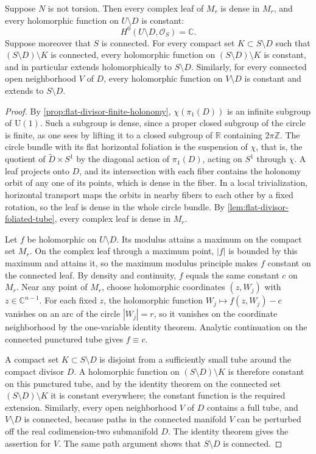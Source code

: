 \begin{theorem}\label{thm:flat-divisor-holomorphic-rigidity}
Suppose $N$ is not torsion. Then every complex leaf of $M_r$ is dense in $M_r$, and every holomorphic function on $U\setminus D$ is constant:
\[
 H^0(U\setminus D,\mathcal O_S)=\mathbb C.
\]
Suppose moreover that $S$ is connected. For every compact set $K\subset S\setminus D$ such that $(S\setminus D)\setminus K$ is connected, every holomorphic function on $(S\setminus D)\setminus K$ is constant, and in particular extends holomorphically to $S\setminus D$. Similarly, for every connected open neighborhood $V$ of $D$, every holomorphic function on $V\setminus D$ is constant and extends to $S\setminus D$.
\end{theorem}
\begin{proof}
By \cref{prop:flat-divisor-finite-holonomy}, $\chi(\pi_1(D))$ is an infinite subgroup of $\mathrm U(1)$. Such a subgroup is dense, since a proper closed subgroup of the circle is finite, as one sees by lifting it to a closed subgroup of $\mathbb R$ containing $2\pi\mathbb Z$. The circle bundle with its flat horizontal foliation is the suspension of $\chi$, that is, the quotient of $\widetilde D\times S^1$ by the diagonal action of $\pi_1(D)$, acting on $S^1$ through $\chi$. A leaf projects onto $D$, and its intersection with each fiber contains the holonomy orbit of any one of its points, which is dense in the fiber. In a local trivialization, horizontal transport maps the orbits in nearby fibers to each other by a fixed rotation, so the leaf is dense in the whole circle bundle. By \cref{lem:flat-divisor-foliated-tube}, every complex leaf is dense in $M_r$.

Let $f$ be holomorphic on $U\setminus D$. Its modulus attains a maximum on the compact set $M_r$. On the complex leaf through a maximum point, $|f|$ is bounded by this maximum and attains it, so the maximum modulus principle makes $f$ constant on the connected leaf. By density and continuity, $f$ equals the same constant $c$ on $M_r$. Near any point of $M_r$, choose holomorphic coordinates $(z,W_j)$ with $z\in\mathbb C^{n-1}$. For each fixed $z$, the holomorphic function $W_j\mapsto f(z,W_j)-c$ vanishes on an arc of the circle $|W_j|=r$, so it vanishes on the coordinate neighborhood by the one-variable identity theorem. Analytic continuation on the connected punctured tube gives $f\equiv c$.

A compact set $K\subset S\setminus D$ is disjoint from a sufficiently small tube around the compact divisor $D$. A holomorphic function on $(S\setminus D)\setminus K$ is therefore constant on this punctured tube, and by the identity theorem on the connected set $(S\setminus D)\setminus K$ it is constant everywhere; the constant function is the required extension. Similarly, every open neighborhood $V$ of $D$ contains a full tube, and $V\setminus D$ is connected, because paths in the connected manifold $V$ can be perturbed off the real codimension-two submanifold $D$. The identity theorem gives the assertion for $V$. The same path argument shows that $S\setminus D$ is connected.
\end{proof}

